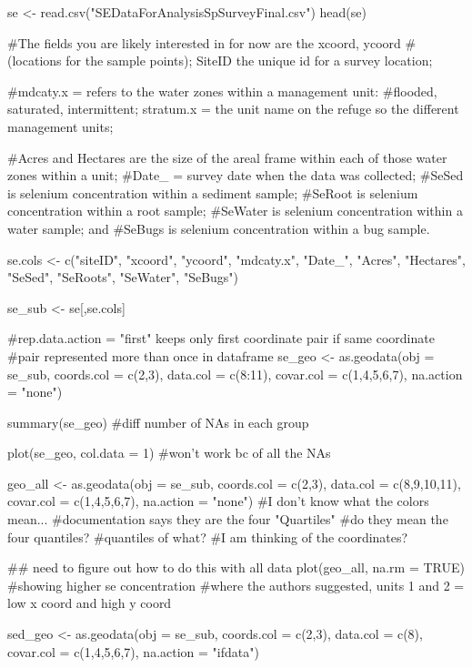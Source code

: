 \documentclass[a4paper]{article}
\begin{document}
se <- read.csv("SEDataForAnalysisSpSurveyFinal.csv")
head(se)

#The fields you are likely interested in for now are the xcoord, ycoord 
#(locations for the sample points); SiteID the unique id for a survey location; 

#mdcaty.x = refers to the water zones within a management unit: 
#flooded, saturated, intermittent; stratum.x = the unit name on the refuge so the different management units;

#Acres and Hectares are the size of the areal frame within each of those water zones within a unit; 
#Date_ = survey date when the data was collected;
#SeSed is selenium concentration within a sediment sample;
#SeRoot is selenium concentration within a root sample; 
#SeWater is selenium concentration within a water sample; and 
#SeBugs is selenium concentration within a bug sample.



se.cols <- c("siteID", "xcoord", "ycoord", "mdcaty.x", "Date_", "Acres", "Hectares", 
             "SeSed", "SeRoots", "SeWater", "SeBugs")

se_sub <- se[,se.cols]

#rep.data.action = "first" keeps only first coordinate pair if same coordinate
#pair represented more than once in dataframe
se_geo <- as.geodata(obj = se_sub, coords.col = c(2,3), 
                     data.col = c(8:11), covar.col = c(1,4,5,6,7), 
                     na.action = "none")

summary(se_geo)
#diff number of NAs in each group

plot(se_geo, col.data = 1)
#won't work bc of all the NAs

geo_all <- as.geodata(obj = se_sub, coords.col = c(2,3), 
                     data.col = c(8,9,10,11), 
                     covar.col = c(1,4,5,6,7), 
                     na.action = "none")
#I don't know what the colors mean... 
#documentation says they are the four "Quartiles"
#do they mean the four quantiles?
#quantiles of what?
#I am thinking of the coordinates?

## need to figure out how to do this with all data
plot(geo_all, na.rm = TRUE)
#showing higher se concentration 
#where the authors suggested, units 1 and 2 = low x coord and high y coord

sed_geo <- as.geodata(obj = se_sub, coords.col = c(2,3), 
                      data.col = c(8), 
                      covar.col = c(1,4,5,6,7), 
                      na.action = "ifdata")
\end{document}
